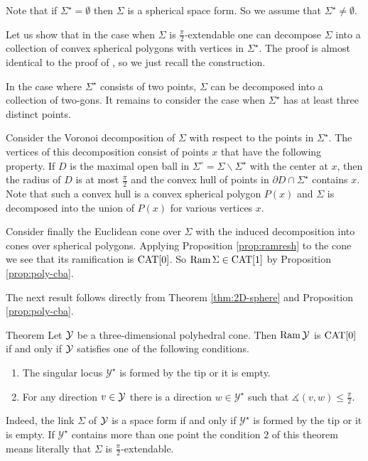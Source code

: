 \documentclass[oneside,a4paper]{article}
\begin{document}
Note that if $\Sigma^{{\star}}=\emptyset$ then
$\Sigma$ is a spherical space form.
So we assume that $\Sigma^{{\star}}\ne\emptyset$.

Let us show that in the case when $\Sigma$ is $\frac{\pi}{2}$-extendable one can
decompose $\Sigma$ into a collection of convex spherical
polygons with vertices in $\Sigma^{{\star}}$.
The proof is almost identical to the
proof of \cite[Proposition 3.1]{thurston},
so we just recall the construction.

In the case where $\Sigma^{{\star}}$ consists of two points,
$\Sigma$ can be decomposed into a collection of two-gons.
It remains to consider the case when $\Sigma^{{\star}}$ has at least three distinct points.

Consider the Voronoi decomposition of $\Sigma$ with respect to the points in $\Sigma^{{\star}}$.
The vertices of this decomposition
consist of points $x$ that have the following property.
If $D$ is the maximal open ball in $\Sigma^\circ=\Sigma\backslash \Sigma^{{\star}}$
with the center at $x$, then the radius of $D$ is at most $\tfrac\pi2$ and the convex hull of points in  $\partial D\cap \Sigma^{{\star}}$
contains $x$.
Note that such a convex hull is a convex spherical polygon $P(x)$ and $\Sigma$ is decomposed
into the union of $P(x)$ for various vertices $x$.

Consider finally the Euclidean cone over $\Sigma$ with the induced decomposition
into cones over spherical polygons. Applying Proposition \ref{prop:ramresh} to the cone we
see that its ramification is $\mathrm{CAT}[0]$. So $\mathop{\rm Ram}\nolimits\Sigma\in \mathrm{CAT}[1]$ by Proposition \ref{prop:poly-cba}.
\qeds

The next result follows directly from Theorem \ref{thm:2D-sphere} and Proposition \ref{prop:poly-cba}.

\begin{thm}{Theorem}\label{3cone}
Let $\mathcal{Y}$ be a three-dimensional polyhedral cone.
Then $\mathop{\rm Ram}\nolimits \mathcal{Y}$ is $\mathrm{CAT}[0]$
if and only if
$\mathcal{Y}$ satisfies one of the following conditions.
\begin{enumerate}
\item The singular locus $\mathcal{Y}^\star$ is formed by the tip or it is empty.
\item For any direction $v\in\mathcal{Y}$ there is a direction $w\in\mathcal{Y}^\star$ such that $\measuredangle(v,w)\le \tfrac\pi2$.
\end{enumerate}
\end{thm}
Indeed, the link $\Sigma$ of $\mathcal{Y}$ is a space form 
if and only if
$\mathcal{Y}^\star$ is formed by the tip or it is empty.
If $\mathcal{Y}^\star$ contains more than one point
the condition $2$ of this theorem means literally that $\Sigma$ is $\frac{\pi}{2}$-extendable.
\end{document}
